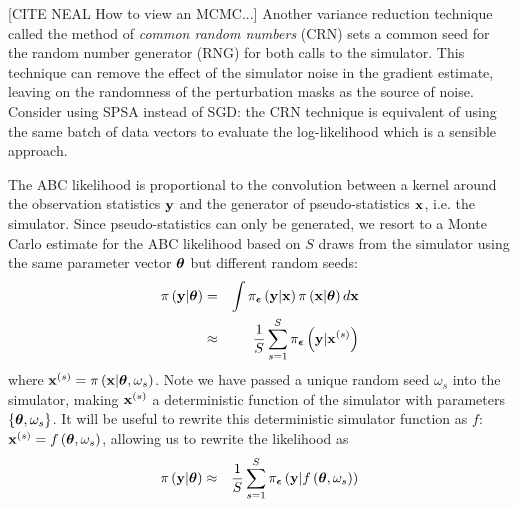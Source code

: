 \documentclass[]{article}
\begin{document}
[CITE NEAL How to view an MCMC...]
Another variance reduction technique called the method of {\em common random numbers} (CRN) \cite{kleinman1999} sets a common seed for the random number generator (RNG) for both calls to the simulator.  This technique can remove the effect of the simulator noise in the gradient estimate, leaving on the randomness of the perturbation masks as the source of noise. Consider using SPSA instead of SGD: the CRN technique is equivalent of using the same batch of data vectors to evaluate the log-likelihood which is a sensible approach.

The ABC likelihood is proportional to the convolution between a kernel around the observation statistics ${\bf y}$ and the generator of pseudo-statistics ${\bf x}$, i.e. the simulator.  Since pseudo-statistics can only be generated, we resort to a Monte Carlo estimate for the ABC likelihood based on $S$ draws from the simulator using the same parameter vector ${\bm \theta}$ but different random seeds:
\begin{eqnarray}
  \pi\left( {\bf y} | {\bm \theta} \right) & = &  \int \pi_{{\bm {\epsilon}}}\left( {\bf y} | {\bf x} \right) \pi\left( {\bf x} | {\bm \theta} \right) d {\bf x} \\
   & \approx & \frac{1}{S} \sum_{s=1}^S \pi_{{\bm {\epsilon}}}\left( {\bf y} | {\bf x}^{(s)} \right)
\end{eqnarray}
where ${\bf x}^{(s)} = \pi\left( {\bf x} | {\bm \theta}, \omega_s \right)$.  Note we have passed a unique random seed $\omega_s$ into the simulator, making ${\bf x}^{(s)}$ a deterministic function of the simulator with parameters $\{{\bm \theta}, \omega_s\}$.  It will be useful to rewrite this deterministic simulator function as $f$: ${\bf x}^{(s)} = f\left( {\bm \theta}, \omega_s \right)$, allowing us to rewrite the likelihood as
\begin{eqnarray}
  \pi\left( {\bf y} | {\bm \theta} \right) & \approx & \frac{1}{S} \sum_{s=1}^S \pi_{{\bm {\epsilon}}}\left( {\bf y} | f\left( {\bm \theta}, \omega_s \right) \right)
\end{eqnarray}
\end{document}
